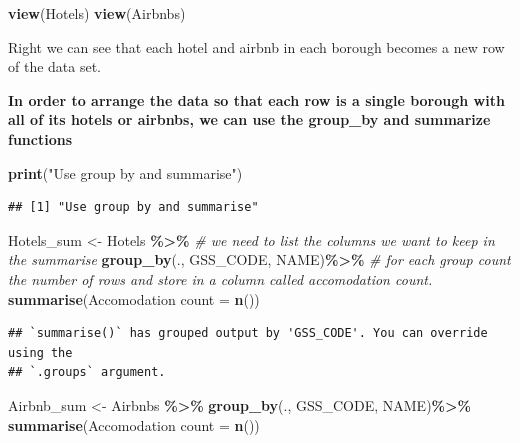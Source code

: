 \documentclass[
]{article}
\newenvironment{Shaded}{\begin{snugshade}}{\end{snugshade}}
\newcommand{\AttributeTok}[1]{\textcolor[rgb]{0.13,0.29,0.53}{#1}}
\newcommand{\CommentTok}[1]{\textcolor[rgb]{0.56,0.35,0.01}{\textit{#1}}}
\newcommand{\FunctionTok}[1]{\textcolor[rgb]{0.13,0.29,0.53}{\textbf{#1}}}
\newcommand{\NormalTok}[1]{#1}
\newcommand{\OtherTok}[1]{\textcolor[rgb]{0.56,0.35,0.01}{#1}}
\newcommand{\SpecialCharTok}[1]{\textcolor[rgb]{0.81,0.36,0.00}{\textbf{#1}}}
\newcommand{\StringTok}[1]{\textcolor[rgb]{0.31,0.60,0.02}{#1}}
\begin{document}
\begin{Shaded}
\begin{Highlighting}[]
\FunctionTok{view}\NormalTok{(Hotels)}
\FunctionTok{view}\NormalTok{(Airbnbs)}
\end{Highlighting}
\end{Shaded}

Right we can see that each hotel and airbnb in each borough becomes a
new row of the data set.

\textbf{In order to arrange the data so that each row is a single
borough with all of its hotels or airbnbs, we can use the group\_by and
summarize functions}

\begin{Shaded}
\begin{Highlighting}[]
\FunctionTok{print}\NormalTok{(}\StringTok{"Use group by and summarise"}\NormalTok{)}
\end{Highlighting}
\end{Shaded}

\begin{verbatim}
## [1] "Use group by and summarise"
\end{verbatim}

\begin{Shaded}
\begin{Highlighting}[]
\NormalTok{Hotels\_sum }\OtherTok{\textless{}{-}}\NormalTok{ Hotels }\SpecialCharTok{\%\textgreater{}\%}
  \CommentTok{\# we need to list the columns we want to keep in the summarise}
  \FunctionTok{group\_by}\NormalTok{(., GSS\_CODE, NAME)}\SpecialCharTok{\%\textgreater{}\%}
  \CommentTok{\# for each group count the number of rows and store in a column called accomodation count.}
  \FunctionTok{summarise}\NormalTok{(}\StringTok{\textasciigrave{}}\AttributeTok{Accomodation count}\StringTok{\textasciigrave{}} \OtherTok{=} \FunctionTok{n}\NormalTok{())}
\end{Highlighting}
\end{Shaded}

\begin{verbatim}
## `summarise()` has grouped output by 'GSS_CODE'. You can override using the
## `.groups` argument.
\end{verbatim}

\begin{Shaded}
\begin{Highlighting}[]
\NormalTok{Airbnb\_sum }\OtherTok{\textless{}{-}}\NormalTok{ Airbnbs }\SpecialCharTok{\%\textgreater{}\%}
  \FunctionTok{group\_by}\NormalTok{(., GSS\_CODE, NAME)}\SpecialCharTok{\%\textgreater{}\%}
  \FunctionTok{summarise}\NormalTok{(}\StringTok{\textasciigrave{}}\AttributeTok{Accomodation count}\StringTok{\textasciigrave{}} \OtherTok{=} \FunctionTok{n}\NormalTok{())}
\end{Highlighting}
\end{Shaded}
\end{document}

